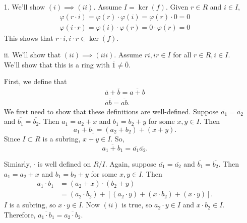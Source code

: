 \documentclass[12pt,letterpaper]{algebra_book}
\renewcommand{\phi}{\varphi}
\theoremstyle{definition}
\begin{document}
    \begin{prf}
        \begin{itemize}
            \item[1.] We'll show $(i) \implies (ii)$. Assume $I =
            \ker(f)$. Given $r \in R$ and $i \in I$, 
            \begin{align*}
                \phi(r \cdot i) = \phi(r)\cdot\phi(i) = \phi(r)\cdot 0 = 0\\
                \phi(i \cdot r) = \phi(i)\cdot\phi(r) = 0 \cdot\phi(r) = 0
            \end{align*}
            This shows that $r \cdot i, i \cdot r \in \ker(f)$. 

            \item[ii.] We'll show that $(ii) \implies (iii)$.
            Assume $ri, ir \in I$ for all $r \in R, i \in I$.
            We'll show that this is a ring with $\overline{1} \ne
            \overline{0}$. 

            First, we define that 
            \begin{align*}
                \overline{a} + \overline{b} = \overline{a + b}\\
                \overline{a}\overline{b} =\overline{ab}.
            \end{align*}
            We first need to show that these definitions are
            well-defined. Suppose $\overline{a_1} =
            \overline{a_2}$ and $\overline{b_1} = \overline{b_2}$.
            Then $a_1 = a_2 + x$ and $b_1 = b_2 + y$ for some
            $x,y\in I$. Then 
            \[
                a_1 + b_1 = (a_2 + b_2) + (x + y).
            \]
            Since $I \subset R$ is a subring, $x+y \in I$. So, 
            \[
                \overline{a_1 + b_1} = \overline{a_1}\overline{a_2}.   
            \]

            Simiarly, $\cdot$ is well defined on $R/I$. Again, suppose $\overline{a_1} =
            \overline{a_2}$ and $\overline{b_1} = \overline{b_2}$.
            Then $a_1 = a_2 + x$ and $b_1 = b_2 + y$ for some
            $x,y\in I$. Then 
            \begin{align*}  
                a_1 \cdot b_1 & = (a_2 + x) \cdot (b_2 + y)\\
                & = (a_2\cdot b_2) + [(a_2 \cdot y) +(x \cdot b_2) + (x \cdot y)].
            \end{align*}    
            $I$ is a subring, so $x \cdot y \in I$. Now $(ii)$ is
            true, so $a_2 \cdot y \in I$ and $x \cdot b_2 \in I$.
            Therefore, $\overline{a_1\cdot b_1} = \overline{a_2
            \cdot b_2}$. 


\end{itemize}
\end{prf}
\end{document}
